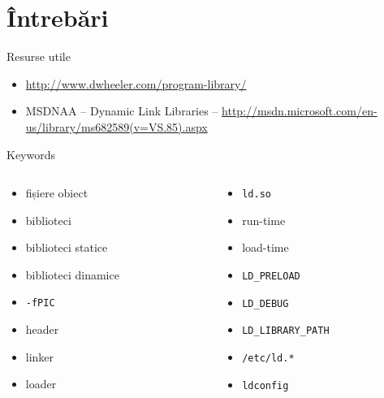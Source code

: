 \documentclass{simple}
\begin{document}
\section{Întrebări}

\begin{frame}{Resurse utile}
  \begin{itemize}
    \item \url{http://www.dwheeler.com/program-library/}
    \item MSDNAA -- Dynamic Link Libraries --
    \url{http://msdn.microsoft.com/en-us/library/ms682589(v=VS.85).aspx}
  \end{itemize}
\end{frame}

\begin{frame}{Keywords}
  \begin{columns}
    \begin{column}{0.5\textwidth}
      \begin{itemize}
        \item fișiere obiect
        \item biblioteci
        \item biblioteci statice
        \item biblioteci dinamice
        \item \texttt{-fPIC}
        \item header
        \item linker
        \item loader
      \end{itemize}
    \end{column}
    \begin{column}{0.5\textwidth}
      \begin{itemize}
        \item \texttt{ld.so}
        \item run-time
        \item load-time
        \item \texttt{LD\_PRELOAD}
        \item \texttt{LD\_DEBUG}
        \item \texttt{LD\_LIBRARY\_PATH}
        \item \texttt{/etc/ld.*}
        \item \texttt{ldconfig}
      \end{itemize}
    \end{column}
  \end{columns}
\end{frame}
\end{document}
